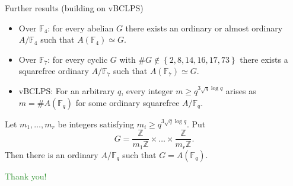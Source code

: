 \documentclass[usenames,dvipsnames]{beamer}
\def\Z{\mathbb{Z}}
\def\F{\mathbb{F}}
\newcommand{\set}[1]{\left\lbrace#1\right\rbrace }
\newcommand{\green}[1]{\textcolor{ForestGreen}{#1}}
\begin{document}
\begin{frame}{ Further results (building on vBCLPS) }
	\begin{itemize}
        \pause
        \item Over $\F_4$: for every abelian $G$ there exists an ordinary or almost ordinary $A/\F_4$ such that $A(\F_4)\simeq G$.
        \pause
        \item Over $\F_7$: for every cyclic $G$ with $\# G\not \in \set{2,8,14,16,17,73}$ there exists a squarefree ordinary $A/\F_7$ such that $A(\F_7)\simeq G$.
        \pause
        \item vBCLPS: For an arbitrary $q$, every integer $m\geq q^{3\sqrt{q}\log q}$ arises as $m=\#A(\F_q)$ for some ordinary squarefree $A/\F_q$.
	\end{itemize}
    \pause
    \begin{theorem}[M.-Springer]
        Let $m_1,\ldots,m_r$ be integers satisfying $m_i\geq q^{3\sqrt{q}\log q}$.
        Put
        \[ G=\frac{\Z}{m_1 \Z}\times \ldots \times \frac{\Z}{m_r \Z}. \]
        \pause
        Then there is an ordinary $A/\F_q$ such that $G=A(\F_q)$.
    \end{theorem}
\end{frame}

\begin{frame}{ }
    \begin{center}
        \green{\huge Thank you!}
    \end{center}
\end{frame}
\end{document}
